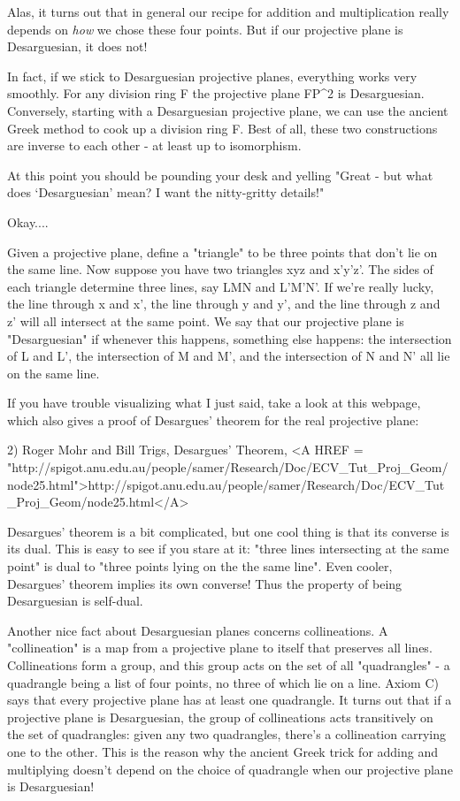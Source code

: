 Alas, it turns out that in general our recipe for addition and 
multiplication really depends on \emph{how} we chose these four points.
But if our projective plane is Desarguesian, it does not!   

In fact, if we stick to Desarguesian projective planes, everything works
very smoothly.   For any division ring F the projective plane FP^2 is
Desarguesian.  Conversely, starting with a Desarguesian projective
plane, we can use the ancient Greek method to cook up a division ring F.
Best of all, these two constructions are inverse to each other - at
least up to isomorphism.

At this point you should be pounding your desk and yelling "Great - but
what does `Desarguesian' mean?  I want the nitty-gritty details!"

Okay....

Given a projective plane, define a "triangle" to be three
points that don't lie on the same line.  Now suppose you have two
triangles xyz and x'y'z'.  The sides of each triangle determine three
lines, say LMN and L'M'N'.  If we're really lucky, the line through x
and x', the line through y and y', and the line through z and z' will
all intersect at the same point.  We say that our projective plane is
"Desarguesian" if whenever this happens, something else
happens: the intersection of L and L', the intersection of M and M', and
the intersection of N and N' all lie on the same line.

If you have trouble visualizing what I just said, take a look at this 
webpage, which also gives a proof of Desargues' theorem for the real
projective plane:

2) Roger Mohr and Bill Trigs, Desargues' Theorem, 
<A HREF = "http://spigot.anu.edu.au/people/samer/Research/Doc/ECV_Tut_Proj_Geom/node25.html">http://spigot.anu.edu.au/people/samer/Research/Doc/ECV_Tut_Proj_Geom/node25.html</A>

Desargues' theorem is a bit complicated, but one cool thing is that 
its converse is its dual.  This is easy to see if you stare at it: 
"three lines intersecting at the same point" is dual to "three points 
lying on the the same line".   Even cooler, Desargues' theorem implies 
its own converse!  Thus the property of being Desarguesian is self-dual.

Another nice fact about Desarguesian planes concerns collineations.  A
"collineation" is a map from a projective plane to itself that 
preserves
all lines.   Collineations form a group, and this group acts on the set
of all "quadrangles" - a quadrangle being a list of four points, no
three of which lie on a line.   Axiom C) says that every projective
plane has at least one quadrangle.  It turns out that if a projective 
plane is Desarguesian, the group of collineations acts transitively on 
the set of quadrangles: given any two quadrangles, there's a collineation
carrying one to the other.  This is the reason why the ancient Greek trick 
for adding and multiplying doesn't depend on the choice of quadrangle when 
our projective plane is Desarguesian!

